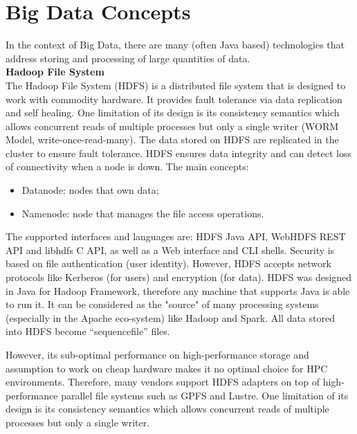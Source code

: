 \section{Big Data Concepts}

In the context of Big Data, there are many (often Java based) technologies that address storing and processing of large quantities of data. \\

\textbf{Hadoop File System}\\
The Hadoop File System (HDFS) is a distributed file system that is designed to work with commodity hardware.
It provides fault tolerance via data replication and self healing.
One limitation of its design is its consistency semantics which allows concurrent reads of multiple processes but only a single writer (WORM Model, write-once-read-many).
The data stored on HDFS are replicated in the cluster to ensure fault tolerance.
HDFS ensures data integrity and can detect loss of connectivity when a node is down.
The main concepts:

\begin{itemize}
	\item Datanode: nodes that own data;
	\item Namenode: node that manages the file access operations.
\end{itemize}

The supported interfaces and languages are: HDFS Java API, WebHDFS REST API and libhdfs C API, as well as a Web interface and CLI shells.
Security is based on file authentication (user identity). However, HDFS accepts network protocols like Kerberos (for users) and encryption (for data).
HDFS was designed in Java for Hadoop Framework, therefore any machine that supports Java is able to run it.
It can be considered as the "source" of many processing systems (especially in the Apache eco-system) like Hadoop and Spark. All data stored into HDFS become “sequencefile” files.

However, its sub-optimal performance on high-performance storage and assumption to work on cheap hardware makes it no optimal choice for HPC environments.
Therefore, many vendors support HDFS adapters on top of high-performance parallel file systems such as GPFS and Lustre.
One limitation of its design is its consistency semantics which allows concurrent reads of multiple processes but only a single writer.
\\

